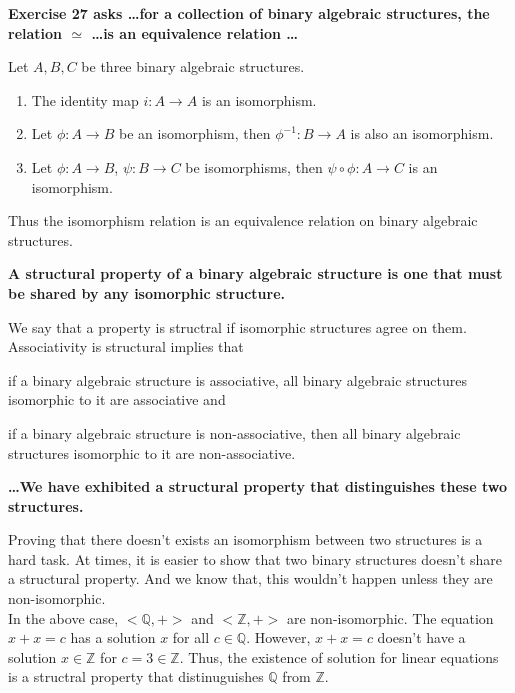 \documentclass[a4paper,12pt,openany]{book}
\newcommand{\iso}{\simeq} %
\begin{document}
\textbf{\phantom{}}
\textbf{Exercise 27 asks \dots for a collection of binary algebraic structures, the relation $\iso$ \dots is an equivalence relation \dots}\\
\begin{story}
	Let $A,B,C$ be three binary algebraic structures.
	\begin{enumerate}
		\item The identity map $i : A \to A$ is an isomorphism.
		\item Let $\phi : A \to B$ be an isomorphism, then $\phi^{-1} : B \to A$ is also an isomorphism.
		\item Let $\phi : A \to B$, $\psi : B \to C$ be isomorphisms, then $\psi\circ\phi : A \to C$ is an isomorphism.
	\end{enumerate}
	Thus the isomorphism relation is an equivalence relation on binary algebraic structures.
\end{story}

\textbf{\phantom{}}
\textbf{A structural property of a binary algebraic structure is one that must be shared by any isomorphic structure.}\\
\begin{story}
	We say that a property is structral if isomorphic structures agree on them.
	Associativity is structural implies that 
	\begin{enumerate*}
		\item if a binary algebraic structure is associative, all binary algebraic structures isomorphic to it are associative and
		\item if a binary algebraic structure is non-associative, then all binary algebraic structures isomorphic to it are non-associative.
	\end{enumerate*}
\end{story}

\textbf{\dots We have exhibited a structural property that distinguishes these two structures.}
\textbf{\phantom{}}\\
\begin{story}
	Proving that there doesn't exists an isomorphism between two structures is a hard task.
	At times, it is easier to show that two binary structures doesn't share a structural property.
	And we know that, this wouldn't happen unless they are non-isomorphic.\\

	In the above case, $<\!\mathbb{Q},+\!>$ and $<\!\mathbb{Z},+\!>$ are non-isomorphic.
	The equation $x+x = c$ has a solution $x$ for all $c \in \mathbb{Q}$.
	However, $x+x = c$ doesn't have a solution $x \in \mathbb{Z}$ for $c = 3 \in \mathbb{Z}$.
	Thus, the existence of solution for linear equations is a structral property that distinuguishes $\mathbb{Q}$ from $\mathbb{Z}$.
\end{story}
\end{document}
